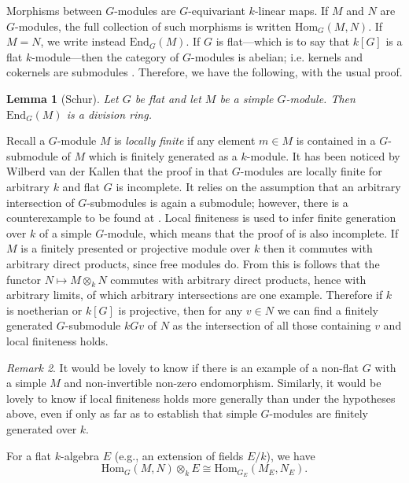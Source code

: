 \documentclass[11pt,reqno]{amsart}
\newtheorem{lemma}{Lemma}[subsection]
\theoremstyle{definition}
\theoremstyle{remark}
\newtheorem{remark}[lemma]{Remark}
\theoremstyle{definition}
\theoremstyle{plain}
\newcommand{\Hom}{\mathrm{Hom}}
\newcommand{\End}{\mathrm{End}}
\begin{document}
Morphisms between $G$-modules are $G$-equivariant $k$-linear maps. 
If $M$ and $N$ are $G$-modules, the full collection of such morphisms is written $\Hom_{G}(M,N)$. If $M=N$, we write instead $\End_G(M)$. If $G$ is flat---which is to say that $k[G]$ is a flat $k$-module---then the category of $G$-modules is abelian; i.e. kernels and cokernels are submodules \cite[I.2.9]{Jan03}. Therefore, we have the following, with the usual proof.
\begin{lemma}[Schur] Let $G$ be flat and let $M$ be a simple $G$-module. Then $\End_G(M)$ is a division ring.\label{lem:schur}\end{lemma}
Recall a $G$-module $M$ is \emph{locally finite} if any element $m\in M$ is contained in a $G$-submodule of $M$ which is finitely generated as a $k$-module. It has been noticed by Wilberd van der Kallen \cite[\S1.7]{vdk21} that the proof in \cite[I.2.13]{Jan03} that $G$-modules are locally finite for arbitrary $k$ and flat $G$ is incomplete. It relies on the assumption that an arbitrary intersection of $G$-submodules is again a submodule; however, there is a counterexample to be found at \cite[Expos\'e VI, Edition 2011, Remarque 11.10.1]{SGA3}. Local finiteness is  used to infer finite generation over $k$ of a simple $G$-module, which means that the proof of \cite[I.10.15]{Jan03} is also incomplete. If $M$ is a finitely presented or projective module over $k$ then it commutes with arbitrary direct products, since free modules do. From this is follows that the functor $N\mapsto M\otimes_k N$ commutes with arbitrary direct products, hence with arbitrary limits, of which arbitrary intersections are one example. Therefore if $k$ is noetherian or $k[G]$ is projective, then for any $v\in N$ we can find a finitely generated $G$-submodule $kGv$ of $N$ as the intersection of all those containing $v$ and local finiteness holds.

\begin{remark}It would be lovely to know if there is an example of a non-flat $G$ with a simple $M$ and non-invertible non-zero endomorphism. Similarly, it would be lovely to know if local finiteness holds more generally than under the hypotheses above, even if only as far as to establish that simple $G$-modules are finitely generated over $k$.\end{remark}
For a flat $k$-algebra $E$ (e.g., an extension of fields $E/k$), we have \cite[I.2.10(7)]{Jan03}
\begin{equation}\label{eq:tensorhom}
\Hom_G(M,N)\otimes_k E \cong \Hom_{G_{E}}(M_{E},N_{E}). 
\end{equation}
\end{document}
